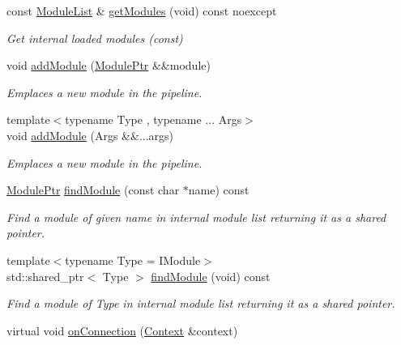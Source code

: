 \begin{DoxyCompactItemize}
const \mbox{\hyperlink{classo_z_1_1_pipeline_a3bb478d291a83763b269d8d27e186a47}{Module\+List}} \& \mbox{\hyperlink{classo_z_1_1_pipeline_a84358c4166a67aabc0d5811608727da9}{get\+Modules}} (void) const noexcept
\begin{DoxyCompactList}\small\item\em Get internal loaded modules (const) \end{DoxyCompactList}\item 
void \mbox{\hyperlink{classo_z_1_1_pipeline_aa96f1ef3faeb41c9966d6b5a103fa3a5}{add\+Module}} (\mbox{\hyperlink{namespaceo_z_af5a56aaaee027504979038f38991adcf}{Module\+Ptr}} \&\&module)
\begin{DoxyCompactList}\small\item\em Emplaces a new module in the pipeline. \end{DoxyCompactList}\item 
{\footnotesize template$<$typename Type , typename ... Args$>$ }\\void \mbox{\hyperlink{classo_z_1_1_pipeline_a797f98947aace930fbb15cd6b2d9f726}{add\+Module}} (Args \&\&...args)
\begin{DoxyCompactList}\small\item\em Emplaces a new module in the pipeline. \end{DoxyCompactList}\item 
\mbox{\hyperlink{namespaceo_z_af5a56aaaee027504979038f38991adcf}{Module\+Ptr}} \mbox{\hyperlink{classo_z_1_1_pipeline_aa8aa56af891b2d889e7c21198daa1451}{find\+Module}} (const char $\ast$name) const
\begin{DoxyCompactList}\small\item\em Find a module of given name in internal module list returning it as a shared pointer. \end{DoxyCompactList}\item 
{\footnotesize template$<$typename Type  = I\+Module$>$ }\\std\+::shared\+\_\+ptr$<$ Type $>$ \mbox{\hyperlink{classo_z_1_1_pipeline_a4f1abc0f7c0985dbc859cd5b20082998}{find\+Module}} (void) const
\begin{DoxyCompactList}\small\item\em Find a module of Type in internal module list returning it as a shared pointer. \end{DoxyCompactList}\item 
virtual void \mbox{\hyperlink{classo_z_1_1_pipeline_ab8665c339158428e7e8851bbb0b000ad}{on\+Connection}} (\mbox{\hyperlink{classo_z_1_1_context}{Context}} \&context)

\end{DoxyCompactItemize}
